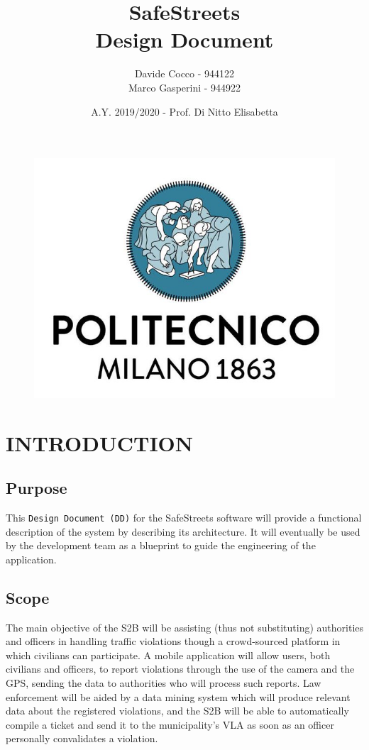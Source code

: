 \documentclass[12pt,a4paper]{article}
\author{Davide Cocco - 944122\\
	Marco Gasperini - 944922}
\date{A.Y. 2019/2020 - Prof. Di Nitto Elisabetta}
\title{
	\textbf{\Huge{SafeStreets}} \\
	\large Design Document
}
\begin{document}
	\begin{figure}
		\centering
		\includegraphics[width=1.0\linewidth]{Images/polimi.jpg}
	\end{figure}

	\maketitle
	\newpage
	\tableofcontents
	\newpage

\section{INTRODUCTION}
\subsection{Purpose}
This \texttt{Design Document (DD)} for the SafeStreets software will provide a functional description of the system by describing its architecture. 
It will eventually be used by the development team as a blueprint to guide the engineering of the application.
\subsection{Scope}
The main objective of the S2B will be assisting (thus not substituting) authorities and officers in handling traffic violations though a crowd-sourced platform in which civilians can participate. 
A mobile application will allow users, both civilians and officers, to report violations through the use of the camera and the GPS, sending the data to authorities who will process such reports. 
Law enforcement will be aided by a data mining system which will produce relevant data about the registered violations, and the S2B will be able to automatically compile a ticket and send it to
the municipality's VLA as soon as an officer personally convalidates a violation.
\end{document}
